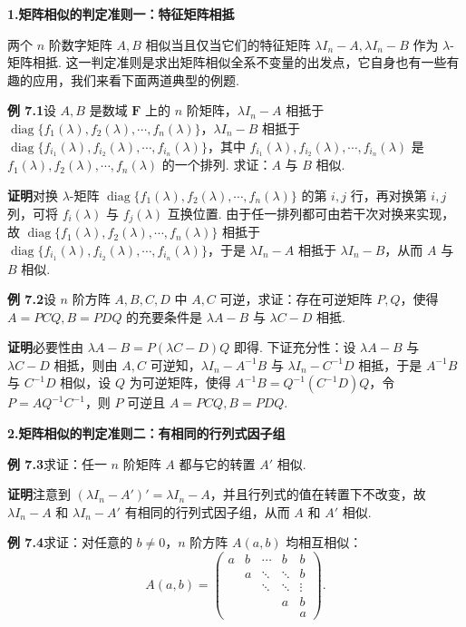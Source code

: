 \documentclass[UTF8, 12pt, fontset=fandol, oneside]{ctexart}
\begin{document}
\noindent\textbf{1.\quad 矩阵相似的判定准则一：特征矩阵相抵}

两个 $n$ 阶数字矩阵 $A,B$ 相似当且仅当它们的特征矩阵 $\lambda I_n-A,\lambda I_n-B$ 作为 $\lambda$-矩阵相抵. 这一判定准则是求出矩阵相似全系不变量的出发点，它自身也有一些有趣的应用，我们来看下面两道典型的例题.

\noindent\textbf{例 7.1}\quad 设 $A,B$ 是数域 $\mathbf{F}$ 上的 $n$ 阶矩阵，$\lambda I_n-A$ 相抵于 $\operatorname{diag}\{f_1(\lambda),f_2(\lambda),\cdots,f_n(\lambda)\}$，$\lambda I_n-B$ 相抵于 $\operatorname{diag}\{f_{i_1}(\lambda),f_{i_2}(\lambda),\cdots,f_{i_n}(\lambda)\}$，其中 $f_{i_1}(\lambda),f_{i_2}(\lambda),\cdots,f_{i_n}(\lambda)$ 是 $f_1(\lambda),f_2(\lambda),\cdots,f_n(\lambda)$ 的一个排列. 求证：$A$ 与 $B$ 相似.

\noindent\textbf{证明}\quad 对换 $\lambda$-矩阵 $\operatorname{diag}\{f_1(\lambda),f_2(\lambda),\cdots,f_n(\lambda)\}$ 的第 $i,j$ 行，再对换第 $i,j$ 列，可将 $f_i(\lambda)$ 与 $f_j(\lambda)$ 互换位置. 由于任一排列都可由若干次对换来实现，故 $\operatorname{diag}\{f_1(\lambda),f_2(\lambda),\cdots,f_n(\lambda)\}$ 相抵于 $\operatorname{diag}\{f_{i_1}(\lambda),f_{i_2}(\lambda),\cdots,f_{i_n}(\lambda)\}$，于是 $\lambda I_n-A$ 相抵于 $\lambda I_n-B$，从而 $A$ 与 $B$ 相似.

\noindent\textbf{例 7.2}\quad 设 $n$ 阶方阵 $A,B,C,D$ 中 $A,C$ 可逆，求证：存在可逆矩阵 $P,Q$，使得 $A=PCQ,B=PDQ$ 的充要条件是 $\lambda A-B$ 与 $\lambda C-D$ 相抵.

\noindent\textbf{证明}\quad 必要性由 $\lambda A-B=P(\lambda C-D)Q$ 即得. 下证充分性：设 $\lambda A-B$ 与 $\lambda C-D$ 相抵，则由 $A,C$ 可逆知，$\lambda I_n-A^{-1}B$ 与 $\lambda I_n-C^{-1}D$ 相抵，于是 $A^{-1}B$ 与 $C^{-1}D$ 相似，设 $Q$ 为可逆矩阵，使得 $A^{-1}B=Q^{-1}(C^{-1}D)Q$，令 $P=AQ^{-1}C^{-1}$，则 $P$ 可逆且 $A=PCQ,B=PDQ$.

\noindent\textbf{2.\quad 矩阵相似的判定准则二：有相同的行列式因子组}

\noindent\textbf{例 7.3}\quad 求证：任一 $n$ 阶矩阵 $A$ 都与它的转置 $A'$ 相似.

\noindent\textbf{证明}\quad 注意到 $(\lambda I_n-A')'=\lambda I_n-A$，并且行列式的值在转置下不改变，故 $\lambda I_n-A$ 和 $\lambda I_n-A'$ 有相同的行列式因子组，从而 $A$ 和 $A'$ 相似.

\noindent\textbf{例 7.4}\quad 求证：对任意的 $b\ne 0$，$n$ 阶方阵 $A(a,b)$ 均相互相似：
\[
A(a,b)=
\left(\begin{array}{ccccc}
a & b & \cdots & b & b\\
  & a & \ddots & \ddots & b\\
  &   & \ddots & \ddots & \vdots\\
  &   &        & a & b\\
  &   &        &   & a
\end{array}\right).
\]
\end{document}
